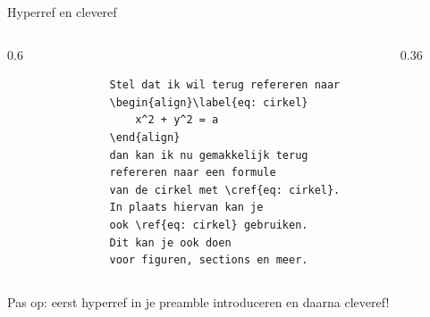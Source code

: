 \begin{frame}[fragile, t]{Hyperref en cleveref}
	\begin{columns}[t]
		\begin{column}{0.6\textwidth}
			\begin{verbatim}
				Stel dat ik wil terug refereren naar 
				\begin{align}\label{eq: cirkel}
					x^2 + y^2 = a
				\end{align}
				dan kan ik nu gemakkelijk terug 
				refereren naar een formule 
				van de cirkel met \cref{eq: cirkel}.
				In plaats hiervan kan je
				ook \ref{eq: cirkel} gebruiken.
				Dit kan je ook doen 
				voor figuren, sections en meer.
			\end{verbatim}
			\par
		\end{column}
		
		\begin{column}{0.36\textwidth}
			\vspace{1mm}
		\end{column}
	\end{columns}
	\vspace{0.5cm}
	Pas op: eerst hyperref in je preamble introduceren en daarna cleveref!
\end{frame}


